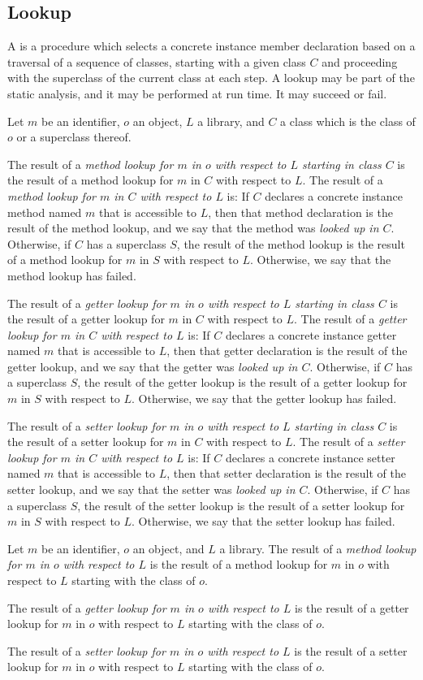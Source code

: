 \documentclass[makeidx]{article}
\begin{document}
\subsection{Lookup}

\LMHash{}%
A  is a procedure which selects
a concrete instance member declaration based on a traversal of
a sequence of classes, starting with a given class $C$
and proceeding with the superclass of the current class at each step.
A lookup may be part of the static analysis, and it may be performed
at run time. It may succeed or fail.


{ %

\def\LookupDefinitionWithStart#1{
\LMHash{}%
The result of a
{\em {#1} lookup for $m$ in $o$ with respect to $L$ starting in class $C$}
is the result of a {#1} lookup for $m$ in $C$ with respect to $L$.
The result of a {\em {#1} lookup for $m$ in $C$ with respect to $L$} is:
If $C$ declares a concrete instance {#1} named $m$
that is accessible to $L$,
then that {#1} declaration is the result of the {#1} lookup,
and we say that the {#1} was {\em looked up in $C$}.
Otherwise, if $C$ has a superclass $S$,
the result of the {#1} lookup is
the result of a {#1} lookup for $m$ in $S$ with respect to $L$.
Otherwise, we say that the {#1} lookup has failed.

}

\LMHash{}%
Let $m$ be an identifier, $o$ an object, $L$ a library,
and $C$ a class which is the class of $o$ or a superclass thereof.

\LookupDefinitionWithStart{method}
\LookupDefinitionWithStart{getter}
\LookupDefinitionWithStart{setter}

\def\LookupDefinition#1{%
The result of a
{\em {#1} lookup for $m$ in $o$ with respect to $L$}
is the result of a
{#1} lookup for $m$ in $o$ with respect to $L$
starting with the class of $o$.
}

\LMHash{}%
Let $m$ be an identifier, $o$ an object, and $L$ a library.
\LookupDefinition{method}
\LookupDefinition{getter}
\LookupDefinition{setter}

} %
\end{document}
